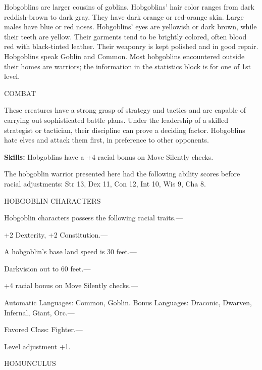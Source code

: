 \documentclass{article}
\begin{document}
Hobgoblins are larger cousins of goblins. Hobgoblins' hair color ranges from dark 
reddish-brown to dark gray. They have dark orange or red-orange skin. Large males 
have blue or red noses. Hobgoblins' eyes are yellowish or dark brown, while their 
teeth are yellow. Their garments tend to be brightly colored, often blood red with 
black-tinted leather. Their weaponry is kept polished and in good repair. Hobgoblins 
speak Goblin and Common. Most hobgoblins encountered outside their homes are warriors; 
the information in the statistics block is for one of 1st level.

COMBAT

These creatures have a strong grasp of strategy and tactics and are capable of 
carrying out sophisticated battle plans. Under the leadership of a skilled strategist 
or tactician, their discipline can prove a deciding factor. Hobgoblins hate elves 
and attack them first, in preference to other opponents.

\textbf{Skills:} Hobgoblins have a +4 racial bonus on Move Silently checks.

The hobgoblin warrior presented here had the following ability scores before racial 
adjustments: Str 13, Dex 11, Con 12, Int 10, Wis 9, Cha 8.

HOBGOBLIN CHARACTERS

Hobgoblin characters possess the following racial traits.--- 

\parindent=3pt
+2 Dexterity, +2 Constitution.---

\parindent=0pt
A hobgoblin's base land speed is 30 feet.---

Darkvision out to 60 feet.--- 

\parindent=3pt
+4 racial bonus on Move Silently checks.---

\parindent=0pt
Automatic Languages: Common, Goblin. Bonus Languages: Draconic, Dwarven, Infernal, 
Giant, Orc.---

Favored Class: Fighter.---

Level adjustment +1.

\vspace{12pt}
{\LARGE{}HOMUNCULUS}
\end{document}
